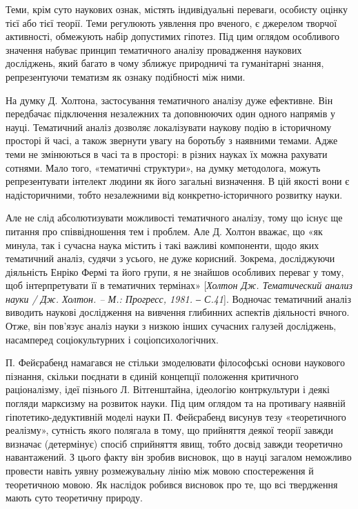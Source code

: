 Теми, крім суто наукових ознак, містять індивідуальні переваги, особисту
оцінку тієї або тієї теорії. Теми регулюють уявлення про вченого, є джерелом
творчої активності, обмежують набір допустимих гіпотез. Під цим оглядом
особливого значення набуває принцип тематичного аналізу провадження
наукових досліджень, який багато в чому зближує природничі та гуманітарні
знання, репрезентуючи тематизм як ознаку подібності між ними.

На думку Д. Холтона, застосування тематичного аналізу дуже ефективне.
Він передбачає підключення незалежних та доповнюючих один одного
напрямів у науці. Тематичний аналіз дозволяє локалізувати наукову подію в
історичному просторі й часі, а також звернути увагу на боротьбу з наявними
темами. Адже теми не змінюються в часі та в просторі: в різних науках їх
можна рахувати сотнями. Мало того, «тематичні структури», на думку
методолога, можуть репрезентувати інтелект людини як його загальні
визначення. В цій якості вони є надісторичними, тобто незалежними від
конкретно-історичного розвитку науки.

Але не слід абсолютизувати можливості тематичного аналізу, тому що існує
ще питання про співвідношення тем і проблем. Але Д. Холтон вважає, що «як
минула, так і сучасна наука містить і такі важливі компоненти, щодо яких
тематичний аналіз, судячи з усього, не дуже корисний. Зокрема, досліджуючи
діяльність Енріко Фермі та його групи, я не знайшов особливих переваг у тому,
щоб інтерпретувати її в тематичних термінах» [\textit{Холтон Дж. Тематический
анализ науки / Дж. Холтон. – М.: Прогресс, 1981. ‒ С.41}]. Водночас тематичний
аналіз виводить наукові дослідження на вивчення глибинних аспектів
діяльності вчного. Отже, він пов’язує аналіз науки з низкою інших сучасних
галузей досліджень, насамперед соціокультурних і соціопсихологічних.

П. Фейєрабенд намагався не стільки змоделювати філософські основи
наукового пізнання, скільки поєднати в єдиній концепції положення
критичного раціоналізму, ідеї пізнього Л. Вітгенштайна, ідеологію
контркультури і деякі погляди марксизму на розвиток науки. Під цим оглядом
та на противагу наявній гіпотетико-дедуктивній моделі науки П. Фейєрабенд
висунув тезу «теоретичного реалізму», сутність якого полягала в тому, що
прийняття деякої теорії завжди визначає (детермінує) спосіб сприйняття явищ,
тобто досвід завжди теоретично навантажений. З цього факту він зробив
висновок, що в науці загалом неможливо провести навіть уявну розмежувальну
лінію між мовою спостереження й теоретичною мовою. Як наслідок робився
висновок про те, що всі твердження мають суто теоретичну природу.

